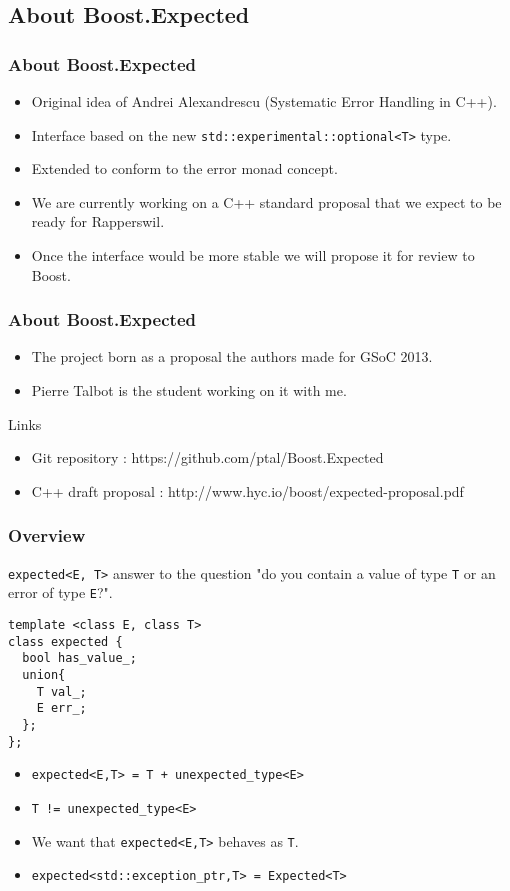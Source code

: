 \documentclass[xcolor=dvipsnames]{beamer}
\newcommand{\cpp}[1]{\lstinline{#1}}
\begin{document}
\subsection{About Boost.Expected}
\begin{frame}
\frametitle{About Boost.Expected}

\begin{itemize}
\item Original idea of Andrei Alexandrescu (Systematic Error Handling in C++).
\item Interface based on the new \cpp{std::experimental::optional<T>} type.
\item Extended to conform to the error monad concept.
\item We are currently working on a C++ standard proposal that we expect to be ready for Rapperswil.
\item Once the interface would be more stable we will propose it for review to Boost.
\end{itemize}
\end{frame}

\begin{frame}
\frametitle{About Boost.Expected}

\begin{itemize}
\item The project born as a proposal the authors made for GSoC 2013.
\item Pierre Talbot is the student working on it with me.
\end{itemize}

\begin{block}{Links}
\begin{itemize}
\item Git repository : https://github.com/ptal/Boost.Expected
\item C++ draft proposal : http://www.hyc.io/boost/expected-proposal.pdf
\end{itemize}
\end{block}
\end{frame}

\begin{frame}[fragile]
\frametitle{Overview}

\cpp{expected<E, T>} answer to the question "do you contain a value of type \cpp{T} or an error of type \cpp{E}?".

\begin{lstlisting}
template <class E, class T>
class expected {
  bool has_value_;
  union{ 
    T val_;
    E err_;
  };
};
\end{lstlisting}

\begin{itemize}
\item \cpp{expected<E,T> = T + unexpected_type<E>}
\item \cpp{T != unexpected_type<E>}
\item We want that \cpp{expected<E,T>} behaves as \cpp{T}.
\item \cpp{expected<std::exception_ptr,T> = Expected<T>}
\end{itemize}

\end{frame}
\end{document}

